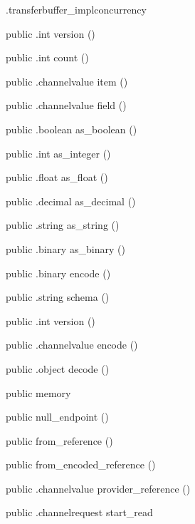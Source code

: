 \begin{CrexxClass}{.transferbuffer\_impl}{concurrency}
\begin{Members}
    \Method
      {public}
      {.int}
      {version}
      {()}

    \Method
      {public}
      {.int}
      {count}
      {()}

    \Method
      {public}
      {.channelvalue}
      {item}
      {()}

    \Method
      {public}
      {.channelvalue}
      {field}
      {()}

    \Method
      {public}
      {.boolean}
      {as\_boolean}
      {()}

    \Method
      {public}
      {.int}
      {as\_integer}
      {()}

    \Method
      {public}
      {.float}
      {as\_float}
      {()}

    \Method
      {public}
      {.decimal}
      {as\_decimal}
      {()}

    \Method
      {public}
      {.string}
      {as\_string}
      {()}

    \Method
      {public}
      {.binary}
      {as\_binary}
      {()}

    \Method
      {public}
      {.binary}
      {encode}
      {()}

    \Method
      {public}
      {.string}
      {schema}
      {()}

    \Method
      {public}
      {.int}
      {version}
      {()}

    \Method
      {public}
      {.channelvalue}
      {encode}
      {()}

    \Method
      {public}
      {.object}
      {decode}
      {()}

    \Factory
      {public}
      {memory}
      {}

    \Factory
      {public}
      {null\_endpoint}
      {()}

    \Factory
      {public}
      {from\_reference}
      {()}

    \Factory
      {public}
      {from\_encoded\_reference}
      {()}

    \Method
      {public}
      {.channelvalue}
      {provider\_reference}
      {()}

    \Method
      {public}
      {.channelrequest}
      {start\_read}
      {}


\end{Members}
\end{CrexxClass}
